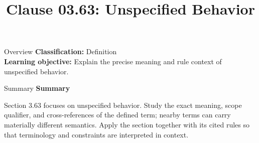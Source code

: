 \documentclass[10pt,letterpaper]{article}
\title{Clause 03.63: Unspecified Behavior}
\author{}
\date{}
\begin{document}
\maketitle
\begin{CornellOverviewBox}{Overview}
\textbf{Classification:} Definition\\[2pt]
\textbf{Learning objective:} Explain the precise meaning and rule context of unspecified behavior.
\end{CornellOverviewBox}\begin{CornellSummaryBox}{Summary}
{\sffamily\bfseries\color{Accent} Summary}\par\vspace{3pt}Section 3.63 focuses on unspecified behavior. Study the exact meaning, scope qualifier, and cross-references of the defined term; nearby terms can carry materially different semantics. Apply the section together with its cited rules so that terminology and constraints are interpreted in context.
\end{CornellSummaryBox}
\end{document}
